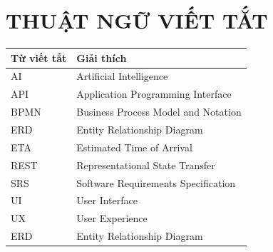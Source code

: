 \chapter*{THUẬT NGỮ VIẾT TẮT}

\begin{longtable}{|L{3cm}|L{10cm}|}
\hline
\textbf{Từ viết tắt} & \textbf{Giải thích} \\
\hline
\endhead
\hline
\endlastfoot
AI & Artificial Intelligence \\
\hline
API & Application Programming Interface \\
\hline
BPMN & Business Process Model and Notation \\
\hline
ERD & Entity Relationship Diagram \\
\hline
ETA & Estimated Time of Arrival \\
\hline
REST & Representational State Transfer \\
\hline
SRS & Software Requirements Specification \\
\hline
UI & User Interface \\
\hline
UX & User Experience \\
\hline
ERD & Entity Relationship Diagram \\
\hline
\end{longtable}

